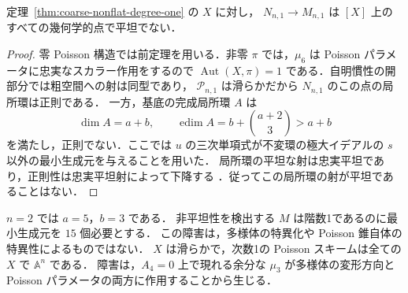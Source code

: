 \begin{corollary}[同じファイバー全体での非平坦性]
\label{cor:coarse-nonflat-entire-fiber}
定理~\ref{thm:coarse-nonflat-degree-one} の $X$ に対し，
$N_{n,1}\to M_{n,1}$ は $[X]$ 上のすべての幾何学的点で平坦でない．
\end{corollary}
\begin{proof}
零 Poisson 構造では前定理を用いる．非零 $\pi$ では，$\mu_6$ は
Poisson パラメータに忠実なスカラー作用をするので
$\operatorname{Aut}(X,\pi)=1$ である．自明慣性の開部分では粗空間への射は同型であり，
$\mathcal P_{n,1}$ は滑らかだから $N_{n,1}$ のこの点の局所環は正則である．
一方，基底の完成局所環 $A$ は
\[
 \dim A=a+b,\qquad
 \operatorname{edim}A=b+\binom{a+2}{3}>a+b
\]
を満たし，正則でない．ここでは $u$ の三次単項式が不変環の極大イデアルの
$s$ 以外の最小生成元を与えることを用いた．
局所環の平坦な射は忠実平坦であり，正則性は忠実平坦射によって下降する
\cite[Tag 07NG]{StacksProject}．従ってこの局所環の射が平坦であることはない．
\end{proof}

\begin{remark}[曲面での大きさ]
$n=2$ では $a=5$，$b=3$ である．
非平坦性を検出する $M$ は階数1であるのに最小生成元を $15$ 個必要とする．
この障害は，多様体の特異化や Poisson 錐自体の特異性によるものではない．
$X$ は滑らかで，次数1の Poisson スキームは全ての $X$ で $\mathbb A^n$ である．
障害は，$A_4=0$ 上で現れる余分な $\mu_3$ が多様体の変形方向と
Poisson パラメータの両方に作用することから生じる．
\end{remark}
